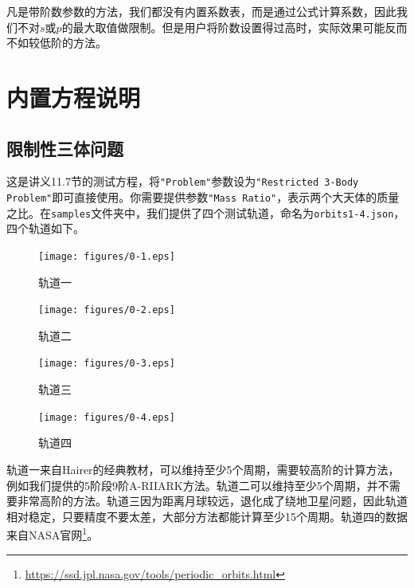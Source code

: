 \documentclass[lang=cn,10pt,bibend=bibtex]{elegantbook}
\begin{document}
凡是带阶数参数的方法，我们都没有内置系数表，而是通过公式计算系数，因此我们不对$s$或$p$的最大取值做限制。但是用户将阶数设置得过高时，实际效果可能反而不如较低阶的方法。

\vspace{-1.2em}
\section{内置方程说明}

\subsection{限制性三体问题}

这是讲义11.7节的测试方程，将\verb|"Problem"|参数设为\verb|"Restricted 3-Body Problem"|即可直接使用。你需要提供参数\verb|"Mass Ratio"|，表示两个大天体的质量之比。在\verb|samples|文件夹中，我们提供了四个测试轨道，命名为\verb|orbits1-4.json|，四个轨道如下。

\begin{figure}[H]
  \centering
  \begin{minipage}[t]{0.36\linewidth}
      \centering
      \texttt{[image: figures/0-1.eps]}
      \caption*{\small 轨道一}
  \end{minipage}
  \hspace{2em}
  \begin{minipage}[t]{0.36\linewidth}
      \centering
      \texttt{[image: figures/0-2.eps]}
      \caption*{\small 轨道二}
  \end{minipage}
\end{figure}

\begin{figure}[H]
  \centering
  \begin{minipage}[t]{0.36\linewidth}
    \centering
    \texttt{[image: figures/0-3.eps]}
    \caption*{\small 轨道三}
  \end{minipage}
  \hspace{2em}
  \begin{minipage}[t]{0.36\linewidth}
      \centering
      \texttt{[image: figures/0-4.eps]}
      \caption*{\small 轨道四}
  \end{minipage}
\end{figure}

轨道一来自Hairer的经典教材\cite{1987Solving}，可以维持至少5个周期，需要较高阶的计算方法，例如我们提供的$5$阶段$9$阶A-RIIARK方法。轨道二可以维持至少5个周期，并不需要非常高阶的方法。轨道三因为距离月球较远，退化成了绕地卫星问题，因此轨道相对稳定，只要精度不要太差，大部分方法都能计算至少15个周期。轨道四的数据来自NASA官网\footnote{\url{https://ssd.jpl.nasa.gov/tools/periodic_orbits.html}}。
\end{document}
